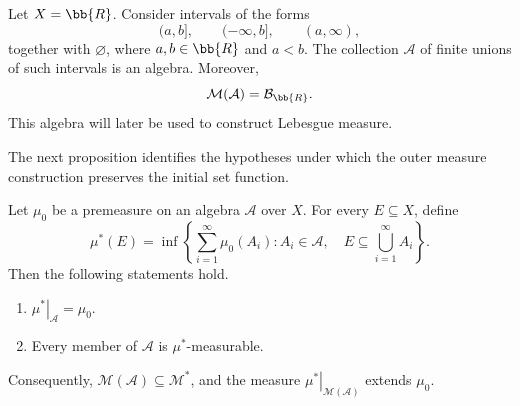 \begin{example}
  Let $X=\bb{R}$. Consider intervals of the forms
  \[
    (a,b],\qquad (-\infty,b],\qquad (a,\infty),
  \]
  together with $\varnothing$, where $a,b\in\bb{R}$ and $a<b$. The
  collection $\mathcal A$ of finite unions of such intervals is an
  algebra. Moreover,
  \[
    \mathcal M(\mathcal A)=\mathcal B_{\bb{R}}.
  \]
  This algebra will later be used to construct Lebesgue measure.
\end{example}

The next proposition identifies the hypotheses under which the outer
measure construction preserves the initial set function.

\begin{proposition}
  Let $\mu_0$ be a premeasure on an algebra $\mathcal A$ over $X$. For
  every $E\subseteq X$, define
  \[
    \mu^*(E)
    =\inf\left\{
      \sum_{i=1}^{\infty}\mu_0(A_i):
      A_i\in\mathcal A,\quad
      E\subseteq\bigcup_{i=1}^{\infty}A_i
    \right\}.
  \]
  Then the following statements hold.
  \begin{enumerate}[label=(\roman*)]
    \item $\left.\mu^*\right|_{\mathcal A}=\mu_0$.
    \item Every member of $\mathcal A$ is $\mu^*$-measurable.
  \end{enumerate}
  Consequently, $\mathcal M(\mathcal A)\subseteq\mathcal M^*$, and the
  measure $\left.\mu^*\right|_{\mathcal M(\mathcal A)}$ extends
  $\mu_0$.
\end{proposition}

